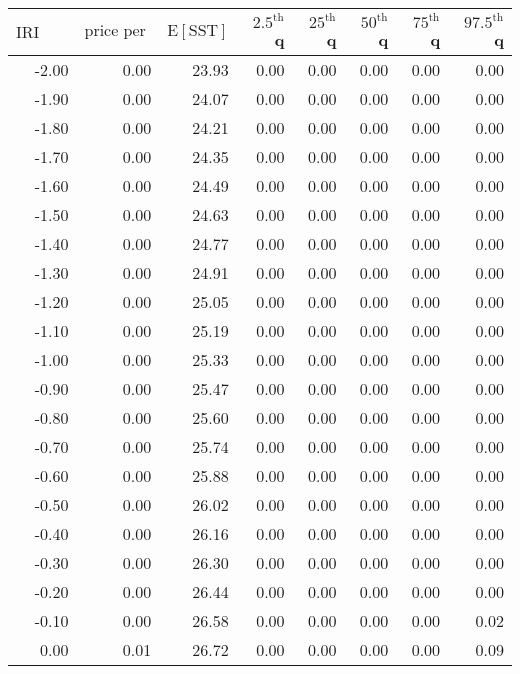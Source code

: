 \begin{table*}[ht]
\centering \footnotesize
\begin{tabular}{rrrrrrrr}
  \hline
$\mbox{IRI anom}$ & $\mbox{price per USD}$ & $\mbox{E}[\mbox{SST}]$ & $2.5^{\mbox{th}}$ q & $25^{\mbox{th}}$ q & $50^{\mbox{th}}$ q & $75^{\mbox{th}}$ q & $97.5^{\mbox{th}}$ q \\ 
  \hline
-2.00 & 0.00 & 23.93 & 0.00 & 0.00 & 0.00 & 0.00 & 0.00 \\ 
  -1.90 & 0.00 & 24.07 & 0.00 & 0.00 & 0.00 & 0.00 & 0.00 \\ 
  -1.80 & 0.00 & 24.21 & 0.00 & 0.00 & 0.00 & 0.00 & 0.00 \\ 
  -1.70 & 0.00 & 24.35 & 0.00 & 0.00 & 0.00 & 0.00 & 0.00 \\ 
  -1.60 & 0.00 & 24.49 & 0.00 & 0.00 & 0.00 & 0.00 & 0.00 \\ 
  -1.50 & 0.00 & 24.63 & 0.00 & 0.00 & 0.00 & 0.00 & 0.00 \\ 
  -1.40 & 0.00 & 24.77 & 0.00 & 0.00 & 0.00 & 0.00 & 0.00 \\ 
  -1.30 & 0.00 & 24.91 & 0.00 & 0.00 & 0.00 & 0.00 & 0.00 \\ 
  -1.20 & 0.00 & 25.05 & 0.00 & 0.00 & 0.00 & 0.00 & 0.00 \\ 
  -1.10 & 0.00 & 25.19 & 0.00 & 0.00 & 0.00 & 0.00 & 0.00 \\ 
  -1.00 & 0.00 & 25.33 & 0.00 & 0.00 & 0.00 & 0.00 & 0.00 \\ 
  -0.90 & 0.00 & 25.47 & 0.00 & 0.00 & 0.00 & 0.00 & 0.00 \\ 
  -0.80 & 0.00 & 25.60 & 0.00 & 0.00 & 0.00 & 0.00 & 0.00 \\ 
  -0.70 & 0.00 & 25.74 & 0.00 & 0.00 & 0.00 & 0.00 & 0.00 \\ 
  -0.60 & 0.00 & 25.88 & 0.00 & 0.00 & 0.00 & 0.00 & 0.00 \\ 
  -0.50 & 0.00 & 26.02 & 0.00 & 0.00 & 0.00 & 0.00 & 0.00 \\ 
  -0.40 & 0.00 & 26.16 & 0.00 & 0.00 & 0.00 & 0.00 & 0.00 \\ 
  -0.30 & 0.00 & 26.30 & 0.00 & 0.00 & 0.00 & 0.00 & 0.00 \\ 
  -0.20 & 0.00 & 26.44 & 0.00 & 0.00 & 0.00 & 0.00 & 0.00 \\ 
  -0.10 & 0.00 & 26.58 & 0.00 & 0.00 & 0.00 & 0.00 & 0.02 \\ 
  0.00 & 0.01 & 26.72 & 0.00 & 0.00 & 0.00 & 0.00 & 0.09 \\ 

\end{tabular}
\end{table*}

